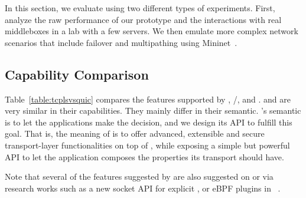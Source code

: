 
In this section, we evaluate \tcpls using two different types of experiments. First, analyze the raw performance of our \tcpls prototype and the interactions with real middleboxes in a lab with a few servers. We then emulate more complex network scenarios that include failover and multipathing using Mininet~\cite{handigol2012reproducible}.





\subsection{Capability Comparison}

Table~\ref{table:tcplsvsquic} compares the features supported by
\tcp, \tls/\tcp, \quic and \tcpls. \quic and \tcpls are very similar in their
capabilities. They mainly differ in their semantic. \tcpls's semantic is to let
the applications make the decision, and we design its API to fulfill this goal.
That is, the meaning of \tcpls is to offer advanced, extensible and secure
transport-layer functionalities on top of \tcp, while exposing a simple but
powerful API to let the application composes the properties its transport should
have.

Note that several of the features suggested by \tcpls are also suggested on \tcp or \quic via research works such as a new socket API for explicit \mptcp \cite{hesmans2016enhanced}, or eBPF plugins in
\quic~\cite{de2019pluginizing}.

